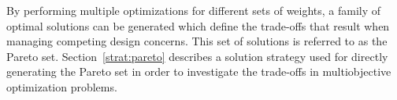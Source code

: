 By performing multiple optimizations for different sets of weights, a
family of optimal solutions can be generated which define the
trade-offs that result when managing competing design concerns. This
set of solutions is referred to as the Pareto set.
Section~\ref{strat:pareto} describes a solution strategy used for
directly generating the Pareto set in order to investigate the
trade-offs in multiobjective optimization problems.




